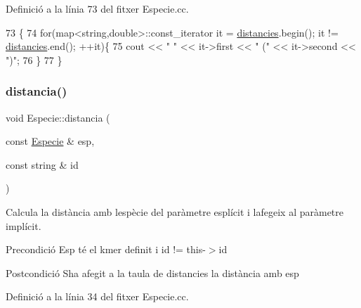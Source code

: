 Definició a la línia 73 del fitxer Especie.\+cc.


\begin{DoxyCode}
73                                        \{
74     \textcolor{keywordflow}{for}(map<string,double>::const\_iterator it = \hyperlink{class_especie_ad4bbf9359ebc17c3c7f501bc31c86509}{distancies}.begin(); it != 
      \hyperlink{class_especie_ad4bbf9359ebc17c3c7f501bc31c86509}{distancies}.end(); ++it)\{
75         cout << \textcolor{stringliteral}{" "} << it->first << \textcolor{stringliteral}{" ("} << it->second << \textcolor{stringliteral}{")"};
76     \}
77 \}
\end{DoxyCode}
\mbox{\label{class_especie_abe0e84ff19b61d434d501f943a542bc9}} 
\subsubsection{\texorpdfstring{distancia()}{distancia()}}
{\footnotesize\ttfamily void Especie\+::distancia (\begin{DoxyParamCaption}\item[{const \hyperlink{class_especie}{Especie} \&}]{esp,  }\item[{const string \&}]{id }\end{DoxyParamCaption})}



Calcula la distància amb l\textquotesingle{}espècie del paràmetre esplícit i l\textquotesingle{}afegeix al paràmetre implícit. 

\begin{DoxyPrecond}{Precondició}
Esp té el kmer definit i id != this-\/$>$id 
\end{DoxyPrecond}
\begin{DoxyPostcond}{Postcondició}
S\textquotesingle{}ha afegit a la taula de distancies la distància amb esp 
\end{DoxyPostcond}


Definició a la línia 34 del fitxer Especie.\+cc.



